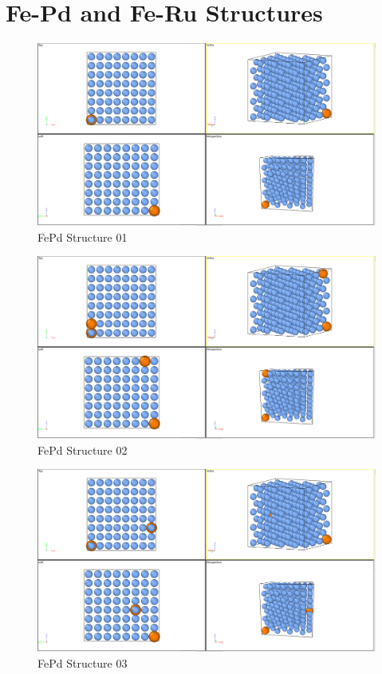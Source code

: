 \chapter{Fe-Pd and Fe-Ru Structures}
\label{chapter:appendix-fepd-feru-structures}

\begin{figure}[htb]
\centering
\includegraphics[width=.85\linewidth]{appendix/fepd_feru_configurations/fepd/fepd256_01r.png}  
\caption{FePd Structure 01}
\label{fig:fepd01}
\end{figure}

\begin{figure}[htb]
\centering
\includegraphics[width=.85\linewidth]{appendix/fepd_feru_configurations/fepd/fepd256_02r.png}  
\caption{FePd Structure 02}
\label{fig:fepd02}
\end{figure}

\begin{figure}[htb]
\centering
\includegraphics[width=.85\linewidth]{appendix/fepd_feru_configurations/fepd/fepd256_03r.png}   
\caption{FePd Structure 03}
\label{fig:fepd03}
\end{figure}

